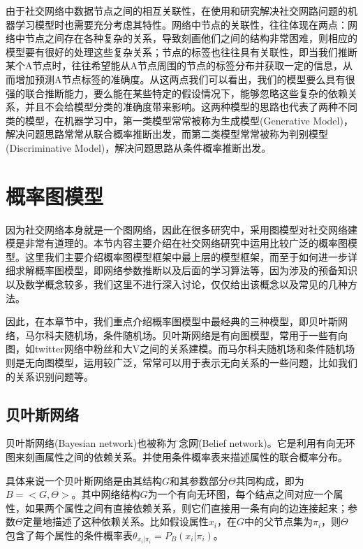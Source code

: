 由于社交网络中数据节点之间的相互关联性，在使用和研究解决社交网路问题的机器学习模型时也需要充分考虑其特性。网络中节点的关联性，往往体现在两点：网络中节点之间存在各种复杂的关系，导致刻画他们之间的结构非常困难，则相应的模型要有很好的处理这些复杂关系；节点的标签也往往具有关联性，即当我们推断某个A节点时，往往希望能从A节点周围的节点的标签分布并获取一定的信息，从而增加预测A节点标签的准确度。从这两点我们可以看出，我们的模型要么具有很强的联合推断能力，要么能在某些特定的假设情况下，能够忽略这些复杂的依赖关系，并且不会给模型分类的准确度带来影响。这两种模型的思路也代表了两种不同类的模型，在机器学习中，第一类模型常常被称为生成模型(Generative Model)，解决问题思路常常从联合概率推断出发，而第二类模型常常被称为判别模型(Discriminative Model)，解决问题思路从条件概率推断出发。

\section{概率图模型}

因为社交网络本身就是一个图网络，因此在很多研究中，采用图模型对社交网络建模是非常有道理的。本节内容主要介绍在社交网络研究中运用比较广泛的概率图模型。这里我们主要介绍概率图模型框架中最上层的模型框架，而至于如何进一步详细求解概率图模型，即网络参数推断以及后面的学习算法等，因为涉及的预备知识以及数学概念较多，我们这里不进行深入讨论，仅仅给出该概念以及常见的几种方法。

因此，在本章节中，我们重点介绍概率图模型中最经典的三种模型，即贝叶斯网络，马尔科夫随机场，条件随机场。贝叶斯网络是有向图模型，常用于一些有向图，如twitter网络中粉丝和大V之间的关系建模。而马尔科夫随机场和条件随机场则是无向图模型，运用较广泛，常常可以用于表示无向关系的一些问题，比如我们的关系识别问题等。


\subsection{贝叶斯网络}

贝叶斯网络(Bayesian network)也被称为\"信念网\"(Belief network)。它是利用有向无环图来刻画属性之间的依赖关系。并使用条件概率表来描述属性的联合概率分布。

具体来说一个贝叶斯网络是由其结构$G$和其参数部分$\Theta$共同构成，即为$B = <G,\Theta >$。其中网络结构$G$为一个有向无环图，每个结点之间对应一个属性，如果两个属性之间有直接依赖关系，则它们直接用一条有向的边连接起来；参数$\Theta$定量地描述了这种依赖关系。比如假设属性$x_i$，在$G$中的父节点集为$\pi_i$，则$\Theta$包含了每个属性的条件概率表$\theta_{x_i|\pi_i}= P_B(x_i|\pi_i)$。

